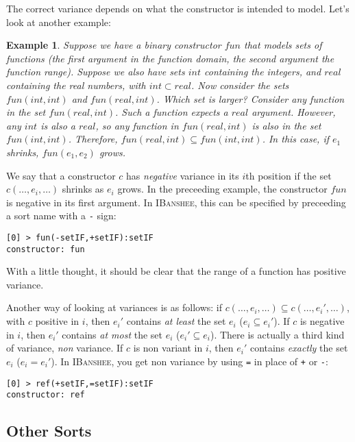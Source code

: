 \documentclass[10pt]{article}
\newcommand{\ibanshee}{\textsc{IBanshee}}
\newtheorem{example}{Example}
\begin{document}
The correct variance depends on what the constructor is intended to
model. Let's look at another example:

\begin{example}
Suppose we have a binary constructor $fun$ that models sets of
functions (the first argument in the function domain, the second
argument the function range). Suppose we also have sets $int$
containing the integers, and $real$ containing the real numbers, with
$int \subset real$. Now consider the sets $fun(int,int)$ and
$fun(real,int)$. Which set is larger? Consider any function in the set
$fun(real,int)$. Such a function expects a $real$ argument. However,
any $int$ is also a $real$, so any function in $fun(real,int)$ is also
in the set $fun(int,int)$. Therefore, $fun(real,int) \subseteq
fun(int,int)$. In this case, if $e_1$ shrinks, $fun(e_1,e_2)$ grows.
\end{example}

We say that a constructor $c$ has \emph{negative} variance in its
$i$th position if the set $c(\ldots,e_i,\ldots)$ shrinks as $e_i$
grows. In the preceeding example, the constructor $fun$ is negative in
its first argument. In \ibanshee{}, this can be specified by
preceeding a sort name with a \texttt{-} sign:

\begin{verbatim}
[0] > fun(-setIF,+setIF):setIF
constructor: fun
\end{verbatim}

With a little thought, it should be clear that the range of a function
has positive variance. 

Another way of looking at variances is as follows: if $c(\ldots, e_i,
\ldots) \subseteq c(\ldots, e_i', \ldots)$, with $c$ positive in $i$,
then $e_i'$ contains \emph{at least} the set $e_i$ ($e_i \subseteq
e_i'$). If $c$ is negative in $i$, then $e_i'$ contains \emph{at most}
the set $e_i$ ($e_i' \subseteq e_i$). There is actually a third kind
of variance, \emph{non} variance. If $c$ is non variant in $i$, then
$e_i'$ contains \emph{exactly} the set $e_i$ ($e_i = e_i'$). In
\ibanshee{}, you get non variance by using \texttt{=} in place of
\texttt{+} or \texttt{-}:

\begin{verbatim}
[0] > ref(+setIF,=setIF):setIF
constructor: ref
\end{verbatim}






\subsection{Other Sorts}
\end{document}
